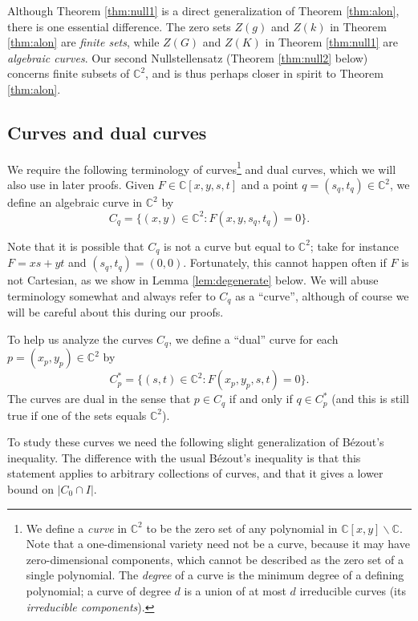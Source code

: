 \documentclass{daj}
\theoremstyle{definition}
\newcommand{\C}{\mathbb C}
\begin{document}
Although Theorem \ref{thm:null1} is a direct generalization of Theorem \ref{thm:alon}, there is one essential difference.
The zero sets $Z(g)$ and $Z(k)$ in Theorem \ref{thm:alon} are \emph{finite sets}, while $Z(G)$ and $Z(K)$ in Theorem \ref{thm:null1} are \emph{algebraic curves}. 
Our second Nullstellensatz (Theorem \ref{thm:null2} below)
concerns finite subsets of $\C^2$, 
and is thus perhaps closer in spirit to Theorem \ref{thm:alon}.

\subsection{Curves and dual curves}

We require the following terminology of curves\footnote{We define a \emph{curve} in $\C^2$ to be the zero set of any polynomial in $\C[x,y]\backslash\C$.
Note that a one-dimensional variety need not be a curve, because it may have zero-dimensional components, which cannot be described as the zero set of a single polynomial.
The \emph{degree} of a curve is the minimum degree of a defining polynomial; a curve of degree $d$ is a union of at most $d$ irreducible curves (its \emph{irreducible components}).} and dual curves, which we will also use in later proofs.
Given $F\in\C[x,y,s,t]$ and a point $q=(s_q,t_q)\in \C^2$, we define an algebraic curve in $\C^2$ by 
\[C_q %
= \{(x,y)\in\C^2:F(x,y,s_q,t_q)=0\}.\]


Note that it is possible that $C_q$ is not a curve but equal to $\C^2$; take for instance $F=xs+yt$ and $(s_q,t_q) = (0,0)$.
Fortunately, this cannot happen often if $F$ is not Cartesian, as we show in Lemma \ref{lem:degenerate} below.
We will abuse terminology somewhat and always refer to $C_q$ as a ``curve'', although of course we will be careful about this during our proofs.

To help us analyze the curves $C_q$, we define a ``dual'' curve for each $p=(x_p,y_p)\in \C^2$ by
\[C_p^* %
= \{(s,t)\in\C^2:F(x_p,y_p,s,t)=0\}.\]
The curves are dual in the sense that $p\in C_q$ if and only if $q\in C_p^*$ (and this is still true if one of the sets equals $\C^2$).

To study these curves we need the following slight generalization of B\'ezout's inequality.
The difference with the usual B\'ezout's inequality is that this statement applies to arbitrary collections of curves, 
and that it gives a lower bound on $|C_0\cap I|$.
\end{document}
